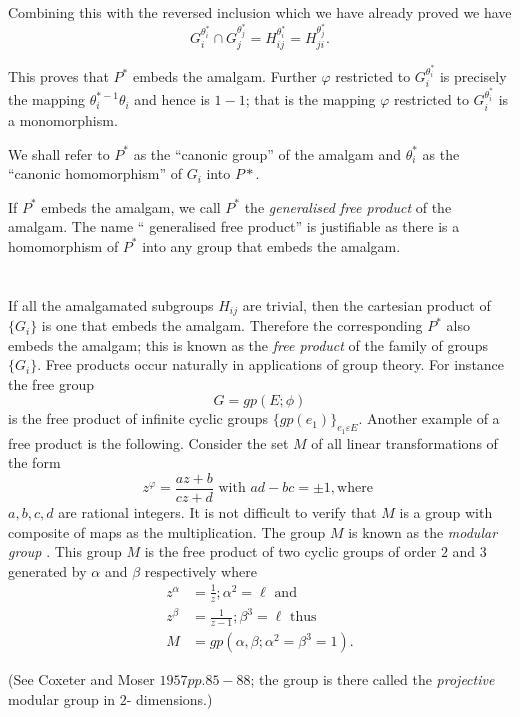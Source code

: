 Combining this with the reversed inclusion which we have already proved we have 
$$
G^{\theta^*_i}_{i} \cap G^{\theta^*_j}_{j} = H^{\theta^*_i}_{ij} =
H^{\theta^*_j}_{ji}. 
$$

This proves that $P^*$ embeds the amalgam. Further $\varphi$
restricted to $G^{\theta^*_i}_{i}$ is precisely the mapping
${\theta^{*-1}_i} {\theta_i}$ and hence is $1-1$; that is the mapping
$\varphi$ restricted to $G^{\theta^*_i}_{i}$ is a monomorphism. 

We shall refer to $P^*$ as the ``canonic group'' of the amalgam and
${\theta^*_i}$ as the ``canonic homomorphism'' of $G_i$ into $P*$. 

If $P^*$ embeds the amalgam, we call $P^*$ the \textit{ generalised
  free product } of the amalgam. The name `` generalised free
product'' is justifiable as there is a homomorphism of $P^*$ into any
group that embeds the amalgam. 

\section{}%

If all the amalgamated subgroups $H_{ij}$ are trivial, then the
cartesian product of $\{G_i \}$ is one that embeds the
amalgam. Therefore the corresponding $P^*$ also embeds the amalgam;
this is  known as the \textit{ free product } of the family of groups
$\{G_i \}$. Free products occur naturally in applications of group
theory. For instance the free group  
$$
G = gp(E ; \phi)
$$
is the free product of infinite cyclic groups $\big\{gp(e_1)
\big\}_{e_1 \varepsilon E}$. Another example of a free product is the
following. Consider the set $M$ of all linear transformations of the
form 
$$
z^{\varphi}= \frac{az+b}{cz+d} \text{ with } ad-bc= \pm 1, \text{
  where } 
$$
$a,b,c,d$ are rational integers. It is not difficult to verify that
$M$ is a group with composite of maps as the multiplication. The group
$M$ is known as the \textit{ modular group }. This group $M$ is the
free product of two cyclic groups of order $2$ and $3$ generated by
$\alpha $ and $\beta$ respectively where   
\begin{align*}
  z^{\alpha} & =  \frac{1}{z}; \alpha^2 = \ell \text{ and }\\
  z^{\beta } & =  \frac{1}{z-1}; \beta^3 = \ell \text{ thus }\\
  M & = gp(\alpha, \beta; \alpha^2 = \beta^3 = 1).
\end{align*}

(See Coxeter and Moser $1957 pp. 85-88$; the group is there called the
\textit{ projective } modular group in $2$- dimensions.) 

